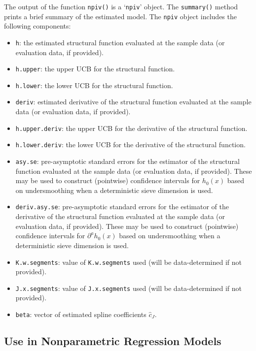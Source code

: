 \documentclass[
]{jss}
\begin{document}
The output of the function \texttt{npiv()} is a `\texttt{npiv}' object.
The \texttt{summary()} method prints a brief summary of the estimated
model. The \texttt{npiv} object includes the following components:

\begin{itemize}
\item
  \texttt{h}: the estimated structural function evaluated at the sample
  data (or evaluation data, if provided).
\item
  \texttt{h.upper}: the upper UCB for the structural function.
\item
  \texttt{h.lower}: the lower UCB for the structural function.
\item
  \texttt{deriv}: estimated derivative of the structural function
  evaluated at the sample data (or evaluation data, if provided).
\item
  \texttt{h.upper.deriv}: the upper UCB for the derivative of the
  structural function.
\item
  \texttt{h.lower.deriv}: the lower UCB for the derivative of the
  structural function.
\item
  \texttt{asy.se}: pre-asymptotic standard errors for the estimator of
  the structural function evaluated at the sample data (or evaluation
  data, if provided). These may be used to construct (pointwise)
  confidence intervals for \(h_0(x)\) based on undersmoothing when a
  deterministic sieve dimension is used.
\item
  \texttt{deriv.asy.se}: pre-asymptotic standard errors for the
  estimator of the derivative of the structural function evaluated at
  the sample data (or evaluation data, if provided). These may be used
  to construct (pointwise) confidence intervals for
  \(\partial^a h_0(x)\) based on undersmoothing when a deterministic
  sieve dimension is used.
\item
  \texttt{K.w.segments}: value of \texttt{K.w.segments} used (will be
  data-determined if not provided).
\item
  \texttt{J.x.segments}: value of \texttt{J.x.segments} used (will be
  data-determined if not provided).
\item
  \texttt{beta}: vector of estimated spline coefficients \(\hat c_J\).
\end{itemize}

\hypertarget{use-in-nonparametric-regression-models}{%
\subsection{Use in Nonparametric Regression
Models}\label{use-in-nonparametric-regression-models}}
\end{document}
